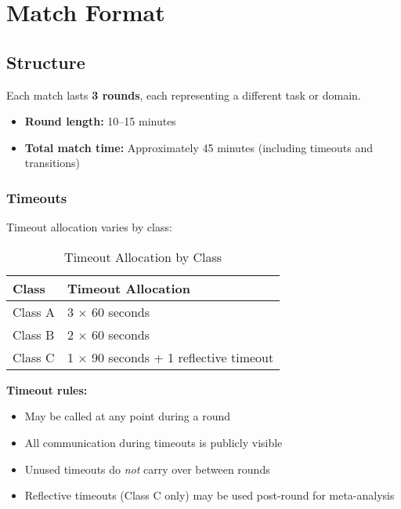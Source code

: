 \chapter{Match Format}
\label{ch:match_format}

\section{Structure}

Each match lasts \textbf{3 rounds}, each representing a different task or domain.

\begin{itemize}[leftmargin=*]
  \item \textbf{Round length:} 10–15 minutes
  \item \textbf{Total match time:} Approximately 45 minutes (including timeouts and transitions)
\end{itemize}

\subsection{Timeouts}

Timeout allocation varies by class:

\begin{table}[h]
\centering
\begin{tabular}{@{}ll@{}}
\toprule
\textbf{Class} & \textbf{Timeout Allocation} \\ \midrule
Class A & 3 $\times$ 60 seconds \\
Class B & 2 $\times$ 60 seconds \\
Class C & 1 $\times$ 90 seconds + 1 reflective timeout \\ \bottomrule
\end{tabular}
\caption{Timeout Allocation by Class}
\label{tab:timeouts}
\end{table}

\textbf{Timeout rules:}
\begin{itemize}[leftmargin=*]
  \item May be called at any point during a round
  \item All communication during timeouts is publicly visible
  \item Unused timeouts do \textit{not} carry over between rounds
  \item Reflective timeouts (Class C only) may be used post-round for meta-analysis
\end{itemize}

